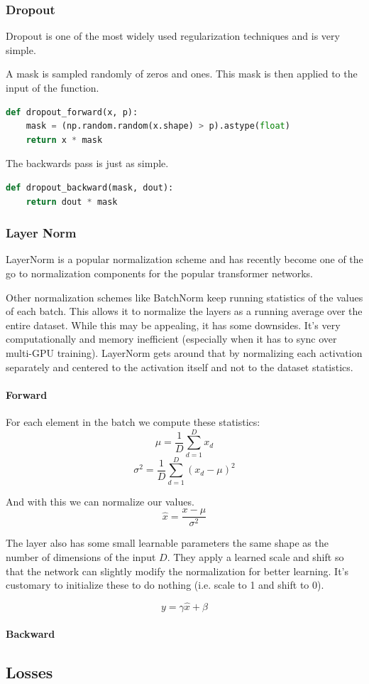 \documentclass{article}
\begin{document}
\subsubsection*{Dropout}
Dropout is one of the most widely used regularization 
techniques and is very simple.

A mask is sampled randomly of zeros and ones. This mask is
then applied to the input of the function.

\begin{lstlisting}[language=Python]
def dropout_forward(x, p):
    mask = (np.random.random(x.shape) > p).astype(float)
    return x * mask
\end{lstlisting}    

The backwards pass is just as simple.
\begin{lstlisting}[language=Python]
def dropout_backward(mask, dout):
    return dout * mask
\end{lstlisting}    

\subsubsection*{Layer Norm}

LayerNorm is a popular normalization scheme and has recently
become one of the go to normalization components for the popular
transformer networks. 

Other normalization schemes like BatchNorm keep running statistics
of the values of each batch. This allows it to normalize the
layers as a running average over the entire dataset. While this
may be appealing, it has some downsides. It's very computationally
and memory inefficient (especially when it has to sync over
multi-GPU training). LayerNorm gets around that by normalizing each
activation separately and centered to the activation itself and not
to the dataset statistics.

\paragraph*{Forward}For each element in the batch we compute these statistics:
$$
\mu = \frac{1}{D}\sum_{d=1}^D x_d
$$
$$
\sigma^2 = \frac{1}{D}\sum_{d=1}^D(x_d - \mu)^2
$$

And with this we can normalize our values.
$$
\hat x = \frac{x - \mu}{\sigma^2}
$$

The layer also has some small learnable parameters the same
shape as the number of dimensions of the input $D$. They apply
a learned scale and shift so that the network can slightly modify
the normalization for better learning. It's customary to initialize
these to do nothing (i.e. scale to 1 and shift to 0).

$$
y = \gamma \hat x + \beta
$$

\paragraph*{Backward}
\subsection*{Losses}
\end{document}
